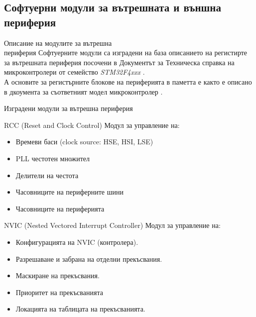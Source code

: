 \documentclass[handout]{beamer}
\begin{document}
\subsection{Софтуерни модули за вътрешната и външна\\периферия}

\begin{frame}{Описание на модулите за вътрешна\\периферия}
	\pause
	Софтуерните модули са изградени на база описанието на регистирте за вътрешната периферия посочени в 
	Документът за Техническа справка на микроконтролери от семейство \textit{STM32F4xxx} \cite{stmcurefman}.\\[1.5em]

	\pause
	А основите за регистърните блокове на периферията в паметта е както е описано в дкоумента за съответният
	модел микроконтролер \cite{stmmcudatasheet}.

\end{frame}

\begin{frame}{Изградени модули за вътрешна периферия}
	\begin{block}{RCC (Reset and Clock Control)}
		Модул за управление на:
		\begin{itemize}
			\item Времеви баси (clock source: HSE, HSI, LSE)
			\item PLL честотен множител
			\item Делители на честота
			\item Часовниците на периферните шини
			\item Часовниците на периферията
		\end{itemize}
	\end{block}

\end{frame}

\begin{frame}

	\begin{block}{NVIC (Nested Vectored Interrupt Controller)}
		Модул за управление на:
		\begin{itemize}
			\item Конфигурацията на NVIC (контролера).
			\item Разрешаване и забрана на отделни прекъсвания.
			\item Маскиране на прекъсвания.
			\item Приоритет на прекъсванията
			\item Локацията на таблицата на прекъсванията.
		\end{itemize}
	\end{block}

\end{frame}
\end{document}
